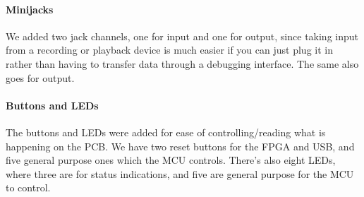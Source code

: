 \paragraph{Minijacks}
We added two jack channels, one for input and one for output, since taking input
from a recording or playback device is much easier if you can just plug it in
rather than having to transfer data through a debugging interface. The same also
goes for output.

\paragraph{Buttons and LEDs}
The buttons and LEDs were added for ease of controlling/reading what is
happening on the PCB. We have two reset buttons for the FPGA and USB, and five
general purpose ones which the MCU controls. There's also eight LEDs, where
three are for status indications, and five are general purpose for the MCU to
control.
